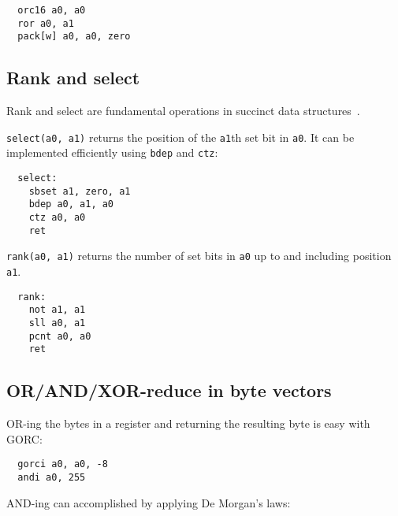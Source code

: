 \begin{verbatim}
  orc16 a0, a0
  ror a0, a1
  pack[w] a0, a0, zero
\end{verbatim}


\subsection{Rank and select}

Rank and select are fundamental operations in succinct data structures~\cite{SelectX86}.

\texttt{select(a0, a1)} returns the position of the \texttt{a1}th set bit in \texttt{a0}.
It can be implemented efficiently using \texttt{bdep} and \texttt{ctz}:

\begin{minipage}{\linewidth}
\begin{verbatim}
  select:
    sbset a1, zero, a1
    bdep a0, a1, a0
    ctz a0, a0
    ret
\end{verbatim}
\end{minipage}

\texttt{rank(a0, a1)} returns the number of set bits in \texttt{a0} up to and
including position \texttt{a1}.

\begin{minipage}{\linewidth}
\begin{verbatim}
  rank:
    not a1, a1
    sll a0, a1
    pcnt a0, a0
    ret
\end{verbatim}
\end{minipage}


\subsection{OR/AND/XOR-reduce in byte vectors}

OR-ing the bytes in a register and returning the resulting byte is
easy with GORC:

\begin{minipage}{\linewidth}
\begin{verbatim}
  gorci a0, a0, -8
  andi a0, 255
\end{verbatim}
\end{minipage}

AND-ing can accomplished by applying De Morgan's laws:

